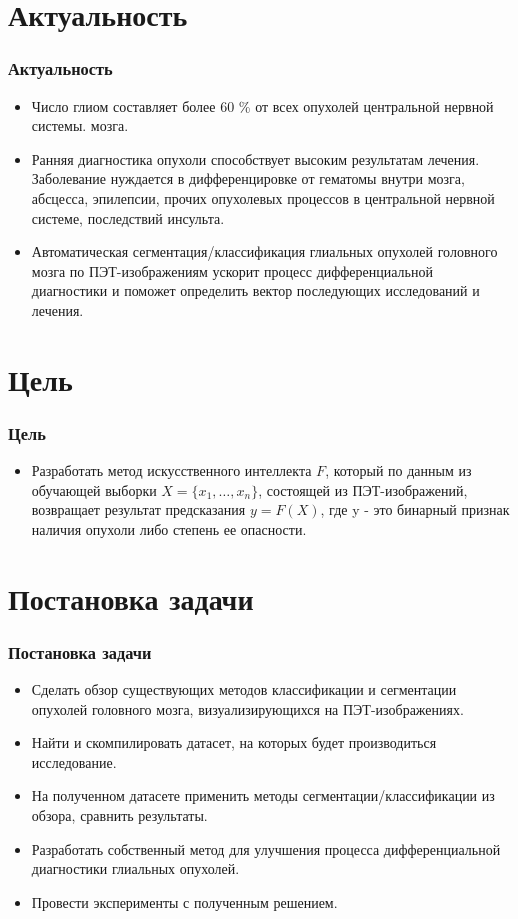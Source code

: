 \section{Актуальность}
\begin{frame}
    \frametitle{Актуальность}
    \begin{itemize}
        \item Число глиом составляет более 60 \% от всех опухолей центральной нервной системы.
        мозга.
        \item Ранняя диагностика опухоли способствует высоким результатам лечения. Заболевание нуждается в дифференцировке от 
        гематомы внутри мозга, абсцесса, эпилепсии, прочих опухолевых процессов в центральной нервной 
        системе, последствий инсульта.
        \item Автоматическая сегментация/классификация глиальных опухолей головного мозга по ПЭТ-изображениям
        ускорит процесс дифференциальной диагностики и поможет определить вектор последующих исследований и лечения.
        
    \end{itemize}
\end{frame}

\section{Цель}
\begin{frame}
    \frametitle{Цель}
    \begin{itemize}
        \item Разработать метод искусственного интеллекта \(F\), который по 
        данным из обучающей выборки \(X=\{x_1,\dots,x_n\}\),
        состоящей из ПЭТ-изображений, возвращает результат предсказания \(y=F(X)\), 
        где y - это бинарный признак наличия опухоли либо степень ее опасности.
    \end{itemize}
\end{frame}

\section{Постановка задачи}
\begin{frame}
    \frametitle{Постановка задачи}
    \begin{itemize}
        \item Сделать обзор существующих методов классификации и сегментации опухолей головного мозга,
        визуализирующихся на ПЭТ-изображениях.
        \item Найти и скомпилировать датасет, на которых будет производиться исследование.
        \item На полученном датасете применить методы сегментации/классификации из обзора, 
        сравнить результаты.
        \item Разработать собственный метод для улучшения процесса дифференциальной 
        диагностики глиальных опухолей.
        \item Провести эксперименты с полученным решением.
    \end{itemize}
\end{frame}